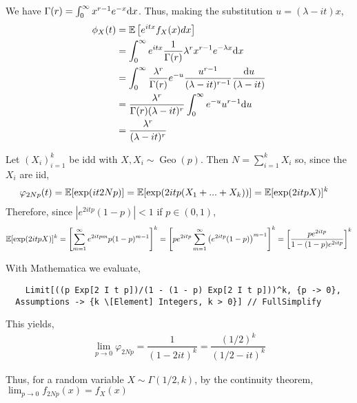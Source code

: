 \begin{solution}[Solution]
We have \( \Gamma(r) = \int_{0}^{\infty} x^{r-1}e^{-x}\mathrm{d} x \). Thus, making the substitution \( u=(\lambda-it)x \),
\begin{align*}
    \phi_X(t) &= \mathbb{E}\left[ e^{itx}f_X(x)dx \right] \\ 
    &= \int_{0}^{\infty} e^{itx} \dfrac{1}{\Gamma(r)}\lambda^r x^{r-1}e^{-\lambda x} \mathrm{d} x \\
    &= \int_{0}^{\infty} \dfrac{\lambda^r}{\Gamma(r)}e^{-u} \dfrac{u^{r-1}}{(\lambda-it)^{r-1}} \dfrac{\mathrm{d} u}{(\lambda-it)} \\
    &= \dfrac{\lambda^r}{\Gamma(r)(\lambda-it)^r}\int_{0}^{\infty} e^{-u}u^{r-1} \mathrm{d} u \\
    &= \dfrac{\lambda^r}{(\lambda-it)^r}
\end{align*}


Let \( (X_i)_{i=1}^{k} \) be idd  with \( X,X_i\sim \operatorname{Geo}(p) \).
Then \( N=\sum_{i=1}^{k} X_i \) so, since the \( X_i \) are iid,
\begin{align*}
    \varphi_{2Np}(t) &= \mathbb{E}[\exp(it2Np)] 
    =\mathbb{E}[\exp(2itp(X_1+...+X_k))] 
    =\mathbb{E}[\exp(2itpX)]^k 
\end{align*}
Therefore, since \( |e^{2itp}(1-p)|<1 \) if \( p\in(0,1) \),
\begin{align*}
    \mathbb{E}[\exp(2itpX)]^k 
    = \left[ \sum_{m=1}^{\infty} e^{2itpm}p(1-p)^{m-1} \right]^k 
    = \left[ pe^{2itp}\sum_{m=1}^{\infty}\left(e^{2itp}(1-p)\right)^{m-1} \right]^k 
    = \left[ \dfrac{pe^{2itp}}{1-(1-p)e^{2itp}} \right]^k
\end{align*}

With Mathematica we evaluate,
\begin{lstlisting}
    Limit[((p Exp[2 I t p])/(1 - (1 - p) Exp[2 I t p]))^k, {p -> 0}, 
  Assumptions -> {k \[Element] Integers, k > 0}] // FullSimplify
\end{lstlisting}

This yields,
\begin{align*}
    \lim_{p\to 0} \varphi_{2Np} = \dfrac{1}{(1-2it)^k} = \dfrac{(1/2)^k}{(1/2-it)^k}
\end{align*}

Thus, for a random variable \( X\sim\Gamma(1/2,k) \), by the continuity theorem, 
\( \lim_{p\to 0} f_{2Np}(x) = f_X(x) \)

\end{solution}

